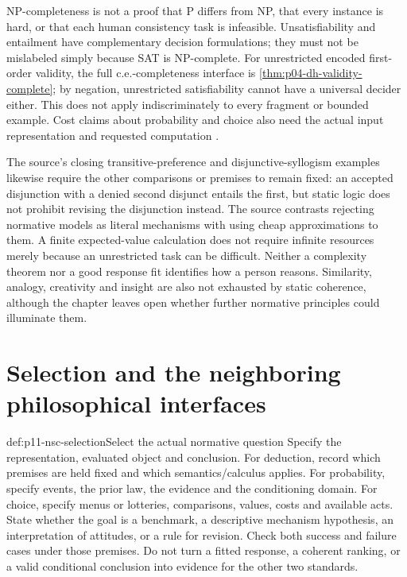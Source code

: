 NP-completeness is not a proof that P differs from NP, that every instance
is hard, or that each human consistency task is infeasible. Unsatisfiability
and entailment have complementary decision formulations; they must not
be mislabeled simply because SAT is NP-complete. For unrestricted encoded
first-order validity, the full c.e.-completeness interface is
\ref{thm:p04-dh-validity-complete}; by negation, unrestricted satisfiability
cannot have a universal decider either. This does not apply indiscriminately
to every fragment or bounded example. Cost claims about probability and
choice also need the actual input representation and requested computation
\cite[pp.~19--20]{ChaterOaksford2012NormativeSystems}.

The source's closing transitive-preference and disjunctive-syllogism
examples likewise require the other comparisons or premises to remain
fixed: an accepted disjunction with a denied second disjunct entails the
first, but static logic does not prohibit revising the disjunction instead.
The source contrasts rejecting normative models as literal mechanisms
with using cheap approximations to them. A finite expected-value calculation
does not require infinite resources merely because an unrestricted task
can be difficult. Neither a complexity theorem nor a good response fit
identifies how a person reasons. Similarity, analogy, creativity and insight
are also not exhausted by static coherence, although the chapter leaves
open whether further normative principles could illuminate them.

\section{Selection and the neighboring philosophical interfaces}
\label{sec:p11-nsc-use}

\begin{hbmethod}{def:p11-nsc-selection}{Select the actual normative question}
Specify the representation, evaluated object and conclusion. For deduction,
record which premises are held fixed and which semantics/calculus applies.
For probability, specify events, the prior law, the evidence and the
conditioning domain. For choice, specify menus or lotteries, comparisons,
values, costs and available acts. State whether the goal is a benchmark,
a descriptive mechanism hypothesis, an interpretation of attitudes, or
a rule for revision. Check both success and failure cases under those
premises. Do not turn a fitted response, a coherent ranking, or a valid
conditional conclusion into evidence for the other two standards.
\end{hbmethod}

